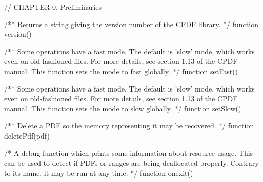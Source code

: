// CHAPTER 0. Preliminaries

/** Returns a string giving the version number of the CPDF library. */
function version()

/** Some operations have a fast mode. The default is 'slow' mode, which works
even on old-fashioned files. For more details, see section 1.13 of the CPDF
manual. This function sets the mode to fast globally. */
function setFast()

/** Some operations have a fast mode. The default is 'slow' mode, which works
even on old-fashioned files. For more details, see section 1.13 of the CPDF
manual. This function sets the mode to slow globally. */
function setSlow()

/** Delete a PDF so the memory representing it may be recovered. */
function deletePdf(pdf)

/* A debug function which prints some information about resource usage. This
can be used to detect if PDFs or ranges are being deallocated properly.
Contrary to its name, it may be run at any time. */
function onexit()
